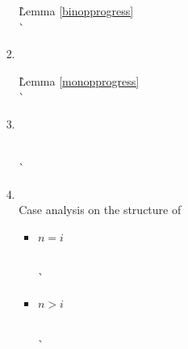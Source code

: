 \begin{enumerate}
\begin{enumerate}
\begin{enumerate}
\begin{enumerate}
        \begin{tabbing}
          \` Lemma \ref{binopprogress} \\
          \`  \\
        \end{tabbing}

      \item {} \ \\

        \begin{tabbing}
          \` Lemma \ref{monopprogress} \\
          \`  \\
        \end{tabbing}

      \item {} \ \\

        \begin{tabbing}
         \\
          \`  \\
        \end{tabbing}

      \item {} \ \\
        Case analysis on the structure of 
        \begin{itemize}
        \item $n = i$
          \begin{tabbing}
           \\
            \`  \\
          \end{tabbing}

        \item $n > i$
          \begin{tabbing}
           \\
            \`  \\
          \end{tabbing}


\end{itemize}
\end{enumerate}
\end{enumerate}
\end{enumerate}
\end{enumerate}
